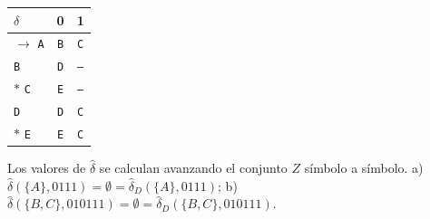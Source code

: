 \documentclass[11pt]{article}
\begin{document}
\begin{center}\small\begin{tabular}{lcc}\toprule
$\delta$ & 0 & 1 \\\midrule
$\to$ \texttt{A} & \texttt{B} & \texttt{C} \\
 \texttt{B} & \texttt{D} & \texttt{--} \\
$*$ \texttt{C} & \texttt{E} & \texttt{--} \\
 \texttt{D} & \texttt{D} & \texttt{C} \\
$*$ \texttt{E} & \texttt{E} & \texttt{C} \\
\bottomrule\end{tabular}\end{center}
Los valores de $\hat\delta$ se calculan avanzando el conjunto $Z$ símbolo a símbolo.
\resp a) $\hat\delta(\{A\}, 0111) = ∅ = \hat\delta_D(\{A\}, 0111)$; b) $\hat\delta(\{B, C\}, 010111) = ∅ = \hat\delta_D(\{B, C\}, 010111)$.
\end{document}
